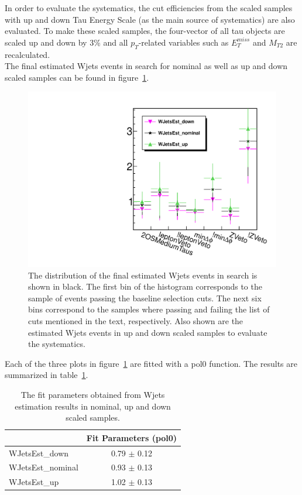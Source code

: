 In order to evaluate the systematics, the cut efficiencies from the scaled samples with 
up and down Tau Energy Scale (as the main source of systematics) are also evaluated.
To make these scaled samples, the four-vector of all tau objects 
are scaled up and down by 3\% and all $p_T$-related variables such as $E_T^{miss}$ 
and $M_{T2}$ are recalculated.\\
The final estimated Wjets events in search \binone for nominal as well as up and down scaled samples 
can be found in figure~\ref{fig:wjets_1}.  
\begin{figure}[!Hhtb]
\centering
\includegraphics[angle=0,scale=0.35]{TauTauFigs/WJets_bin1.pdf}
\caption{The distribution of the final estimated Wjets events in search \binone is shown in black. 
 The first bin of the histogram corresponds to the sample of events passing the baseline selection cuts. 
The next six bins correspond to the samples where passing and failing the 
list of cuts mentioned in the text, respectively. Also shown are the estimated Wjets events in up and down scaled samples to evaluate the systematics.}
\label{fig:wjets_1}
\end{figure}

Each of the three plots in figure~\ref{fig:wjets_1} are fitted with a pol0 function. The results are summarized in table~\ref{tbl:fitpars}.
\begin{table}[!Hhtb]
\begin{center}
\begin{tabular}{lc}
\hline\hline
  & Fit Parameters (pol0) \\
\hline\hline
WJetsEst\_down & 0.79 $\pm$ 0.12 \\
WJetsEst\_nominal & 0.93 $\pm$ 0.13 \\
WJetsEst\_up & 1.02 $\pm$ 0.13 \\
\hline\hline
\end{tabular}
\caption{The fit parameters obtained from Wjets estimation results in nominal, up and down scaled samples.}
\label{tbl:fitpars}
\end{center}
\end{table}

